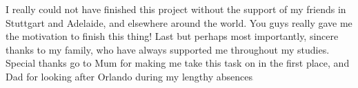 I really could not have finished this project without the support of my friends in Stuttgart and Adelaide, and elsewhere around the world. You guys really gave me the motivation to finish this thing! Last but perhaps most importantly, sincere thanks to my family, who have always supported me throughout my studies. Special thanks go to Mum for making me take this task on in the first place, and Dad for looking after Orlando during my lengthy absences\includegraphics[height=0.5mm]{images/homer_simpson.pdf}%